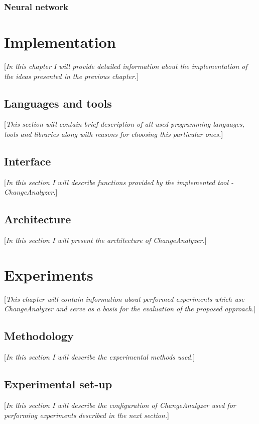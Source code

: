 \documentclass{pracamgr}
\begin{document}
\subsection{Neural network}
\label{sec:neural_net}

\chapter{Implementation}
\label{cha:implementation}
[\textit{In this chapter I will provide detailed information about the implementation of the ideas presented in the previous chapter.}]

\section{Languages and tools}
\label{sec:languagess}
[\textit{This section will contain brief description of all used programming languages, tools and libraries along with reasons for choosing this particular ones.}]

\section{Interface}
\label{sec:interface}
[\textit{In this section I will describe functions provided by the implemented tool - ChangeAnalyzer.}]

\section{Architecture}
\label{sec:architecture}
[\textit{In this section I will present the architecture of ChangeAnalyzer.}]

\chapter{Experiments}
\label{cha:experiments}
[\textit{This chapter will contain information about performed experiments which use ChangeAnalyzer and serve as a basis for the evaluation of the proposed approach.}]

\section{Methodology}
\label{sec:methodology}
[\textit{In this section I will describe the experimental methods used.}]

\section{Experimental set-up}
\label{sec:set-up}
[\textit{In this section I will describe the configuration of ChangeAnalyzer used for performing experiments described in the next section.}]
\end{document}
